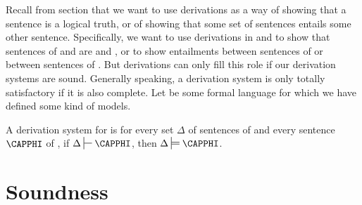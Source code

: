 Recall from section  that we want to use derivations as a way of showing that a sentence is a logical truth, or of showing that some set of sentences entails some other sentence.
Specifically, we want to use derivations in \GSD{} and \GQD{} to show that sentences of \GSL{} and \GQL{} are  and , or to show entailments between sentences of \GSL{} or between sentences of \GQL{}.  
But derivations can only fill this role if our derivation systems are sound.  Generally speaking, a derivation system is only totally satisfactory if it is also complete.
Let  be some formal language for which we have defined some kind of models.
\begin{majorILnc}{}
A derivation system  for  is  \Iff for every set $\Delta$ of sentences of  and every sentence $\CAPPHI$ of , if $\Delta\sststile{}{}\CAPPHI$, then $\Delta\sdtstile{}{}\CAPPHI$.
\end{majorILnc} 


\section{Soundness}

